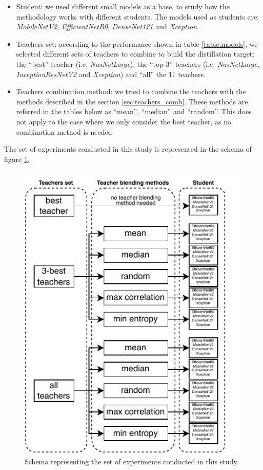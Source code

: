 \begin{itemize}
	\item Student: we used different small models as a base, to study how the methodology works with different students. The models used as students are: \textit{MobileNetV2}, \textit{EfficientNetB0}, \textit{DenseNet121} and \textit{Xception}.
	\item Teachers set: according to the performance shown in table \ref{table:models}, we selected different sets of teachers to combine to build the distillation target: the ``best'' teacher (i.e. \textit{NasNetLarge}), the ``top-3'' teachers (i.e. \textit{NasNetLarge}, \textit{InceptionResNetV2} and \textit{Xception}) and ``all'' the 11 teachers.
	\item Teachers combination method: we tried to combine the teachers with the methods described in the section \ref{sec:teachers_comb}. These methods are referred in the tables below as ``mean'', ``median'' and ``random''. This does not apply to the case where we only consider the best teacher, as no combination method is needed
\end{itemize}

The set of experiments conducted in this study is represented in the schema of figure \ref{fig:schema}.

\begin{figure}[h!]
\centering
\includegraphics[width=0.9\linewidth]{distillation/images/schema}
\caption{Schema representing the set of experiments conducted in this study.}
\label{fig:schema}
\end{figure}


